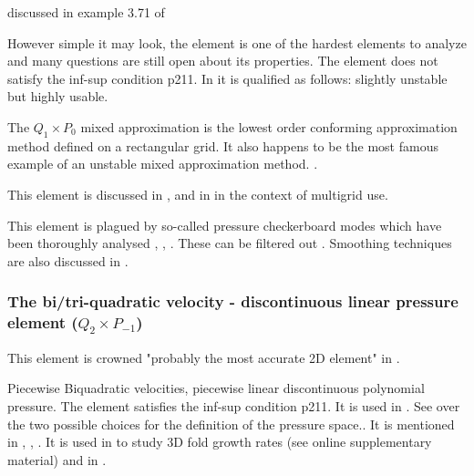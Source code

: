 \begin{minipage}[t]{0.5\textwidth}

\end{minipage}
\begin{minipage}[t]{0.5\textwidth}

\end{minipage}

discussed in example 3.71 of \cite{john16}

However simple it may look, the  element is 
one of the hardest elements to analyze and many questions are still open about its properties. 
The element does not satisfy the inf-sup condition \cite{hugh}p211. 
In \cite{grsa} it is qualified as follows: slightly unstable but highly usable. 

The $Q_1 \times P_0$ mixed approximation is the lowest order conforming approximation 
method defined on a rectangular grid. It also happens to be the most famous example 
of an unstable mixed approximation method.
\cite[p235]{elsw}.

This element is discussed in \cite{fort81}, \cite{fofo85} and in \cite{pisa85} 
in the context of multigrid use.

This element is plagued by so-called pressure checkerboard modes which
have been thoroughly analysed \cite{grsi94}, \cite{chpc95}, \cite{sagl81a,sagl81b}.
These can be filtered out \cite{chpc95}. Smoothing techniques are also discussed in \cite{legs79}.


\Literature \cite{fobo90}



\subsubsection{The bi/tri-quadratic velocity - discontinuous linear pressure element ($Q_2 \times P_{-1}$)}

This element is crowned "probably the most accurate 2D element" in \cite{grsa}.

Piecewise Biquadratic velocities, piecewise linear discontinuous polynomial pressure. 
The element satisfies the inf-sup condition \cite{hugh}p211.
It is used in \cite{vssj89}. 
See \cite{boga02} over the two possible choices for the definition of the pressure space..
It is mentioned in \cite{kaus10}, \cite{boga02}, \cite{pefc89}. It is used in \cite{freh14}
to study 3D fold growth rates (see online supplementary material) and in \cite{schm08}.

